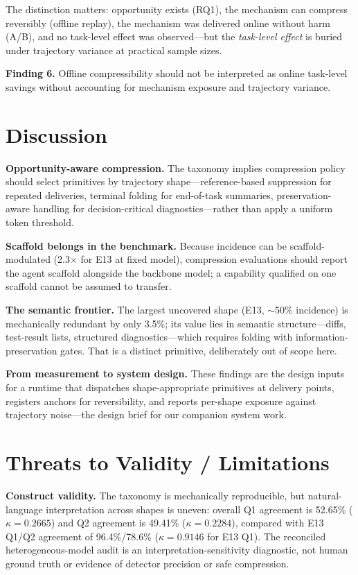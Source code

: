 ﻿\documentclass[sigconf,balance=false]{acmart}
\newenvironment{findingbox}{\par\vskip 3pt\noindent\begin{minipage}{\linewidth}}{\end{minipage}\par\vskip 3pt}
\begin{document}
The distinction matters: opportunity exists (RQ1), the mechanism can compress reversibly (offline replay), the mechanism was delivered online without harm (A/B), and no task-level effect was observed---but the \emph{task-level effect} is buried under trajectory variance at practical sample sizes.

\begin{findingbox}
\textbf{Finding 6.} Offline compressibility should not be interpreted as online task-level savings without accounting for mechanism exposure and trajectory variance.
\end{findingbox}

\section{Discussion}

\textbf{Opportunity-aware compression.} The taxonomy implies compression policy should select primitives by trajectory shape---reference-based suppression for repeated deliveries, terminal folding for end-of-task summaries, preservation-aware handling for decision-critical diagnostics---rather than apply a uniform token threshold.

\textbf{Scaffold belongs in the benchmark.} Because incidence can be scaffold-modulated (2.3$\times$ for E13 at fixed model), compression evaluations should report the agent scaffold alongside the backbone model; a capability qualified on one scaffold cannot be assumed to transfer.

\textbf{The semantic frontier.} The largest uncovered shape (E13, $\sim$50\% incidence) is mechanically redundant by only 3.5\%; its value lies in semantic structure---diffs, test-result lists, structured diagnostics---which requires folding with information-preservation gates. That is a distinct primitive, deliberately out of scope here.

\textbf{From measurement to system design.} These findings are the design inputs for a runtime that dispatches shape-appropriate primitives at delivery points, registers anchors for reversibility, and reports per-shape exposure against trajectory noise---the design brief for our companion system work.

\section{Threats to Validity / Limitations}

\textbf{Construct validity.} The taxonomy is mechanically reproducible, but natural-language interpretation across shapes is uneven: overall Q1 agreement is 52.65\% ($\kappa=0.2665$) and Q2 agreement is 49.41\% ($\kappa=0.2284$), compared with E13 Q1/Q2 agreement of 96.4\%/78.6\% ($\kappa=0.9146$ for E13 Q1). The reconciled heterogeneous-model audit is an interpretation-sensitivity diagnostic, not human ground truth or evidence of detector precision or safe compression.
\end{document}
